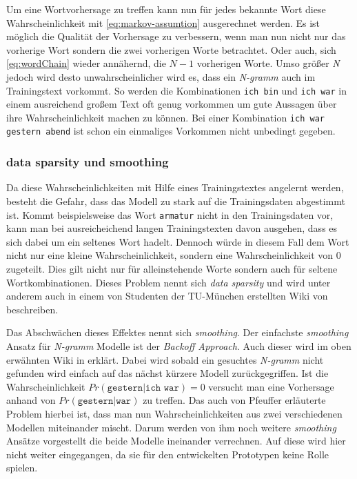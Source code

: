         
    Um eine Wortvorhersage zu treffen kann nun für jedes bekannte Wort diese Wahrscheinlichkeit mit \autoref{eq:markov-assumtion} ausgerechnet werden. Es ist möglich die Qualität der Vorhersage zu verbessern, wenn man nun nicht nur das vorherige Wort sondern die zwei vorherigen Worte betrachtet. Oder auch, sich \autoref{eq:wordChain} wieder annähernd, die \(N - 1\) vorherigen Worte. Umso größer \emph{N} jedoch wird desto unwahrscheinlicher wird es, dass ein \emph{N-gramm} auch im Trainingstext vorkommt. So werden die Kombinationen \texttt{ich bin} und \texttt{ich war} in einem ausreichend großem Text oft genug vorkommen um gute Aussagen über ihre Wahrscheinlichkeit machen zu können. Bei einer Kombination \texttt{ich war gestern abend} ist schon ein einmaliges Vorkommen nicht unbedingt gegeben.
    \newpage
    
    \subsubsection*{data sparsity und smoothing}
        
    Da diese Wahrscheinlichkeiten mit Hilfe eines Trainingstextes angelernt werden, besteht die Gefahr, dass das Modell zu stark auf die Trainingsdaten abgestimmt ist. Kommt beispielsweise das Wort \texttt{armatur} nicht in den Trainingsdaten vor, kann man bei ausreicheichend langen Trainingstexten davon ausgehen, dass es sich dabei um ein seltenes Wort hadelt. Dennoch würde in diesem Fall dem Wort nicht nur eine kleine Wahrscheinlichkeit, sondern eine Wahrscheinlichkeit von 0 zugeteilt. Dies gilt nicht nur für alleinstehende Worte sondern auch für seltene Wortkombinationen. Dieses Problem nennt sich \emph{data sparsity} und wird unter anderem auch in einem von Studenten der TU-München erstellten Wiki von \parencite[Abs. 5]{recognize-speech:n-gramms} beschreiben. 
        
    Das Abschwächen dieses Effektes nennt sich \emph{smoothing}. Der einfachste \emph{smoothing} Ansatz für \emph{N-gramm} Modelle ist der \emph{Backoff Approach}. Auch dieser wird im oben erwähnten Wiki in \parencite{recognize-speech:backoff} erklärt. Dabei wird sobald ein gesuchtes \emph{N-gramm} nicht gefunden wird einfach auf das nächst kürzere Modell zurückgegriffen. Ist die Wahrscheinlichkeit \(Pr(\texttt{gestern}|\texttt{ich war}) = 0\) versucht man eine Vorhersage anhand von \(Pr(\texttt{gestern}|\texttt{war})\) zu treffen. Das auch von Pfeuffer erläuterte Problem hierbei ist, dass man nun Wahrscheinlichkeiten aus zwei verschiedenen Modellen miteinander mischt. Darum werden von ihm noch weitere \emph{smoothing} Ansätze vorgestellt die beide Modelle ineinander verrechnen. Auf diese wird hier nicht weiter eingegangen, da sie für den entwickelten Prototypen keine Rolle spielen.